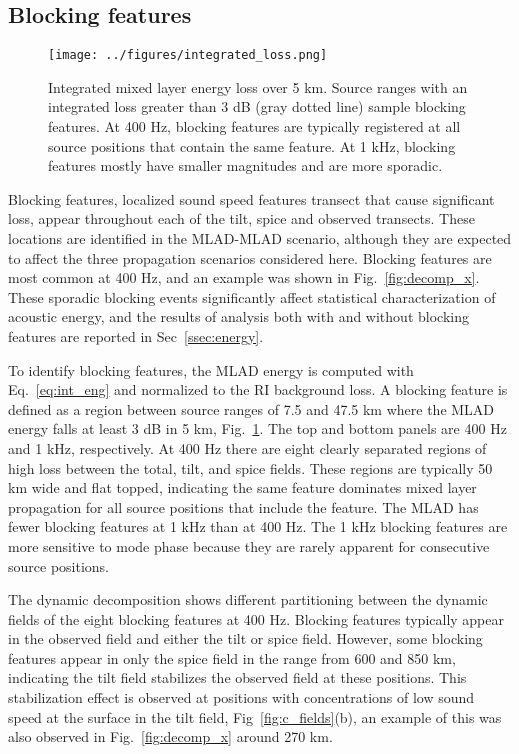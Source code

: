 \documentclass[preprint,NumberedRefs]{JASA}
\begin{document}
\subsection{Blocking features}\label{ssec:blocking}
\begin{figure}
\texttt{[image: ../figures/integrated\_loss.png]}
    \caption{Integrated mixed layer energy loss over 5 km. Source ranges with an integrated loss greater than 3 dB (gray dotted line) sample blocking features. At 400 Hz, blocking features are typically registered at all source positions that contain the same feature. At 1 kHz, blocking features mostly have smaller magnitudes and are more sporadic.}
    \label{fig:blocking}
\end{figure}

Blocking features, localized sound speed features transect that cause significant loss, appear throughout each of the tilt, spice and observed transects. These locations are identified in the MLAD-MLAD scenario, although they are expected to affect the three propagation scenarios considered here. Blocking features are most common at 400 Hz, and an example was shown in Fig.~\ref{fig:decomp_x}. These sporadic blocking events significantly affect statistical characterization of acoustic energy, and the results of analysis both with and without blocking features are reported in Sec~\ref{ssec:energy}.

To identify blocking features, the MLAD energy is computed with Eq.~\eqref{eq:int_eng} and normalized to the RI background loss. A blocking feature is defined as a region between source ranges of 7.5 and 47.5 km where the MLAD energy falls at least 3 dB in 5 km, Fig.~\ref{fig:blocking}. The top and bottom panels are 400 Hz and 1 kHz, respectively. At 400 Hz there are eight clearly separated regions of high loss between the total, tilt, and spice fields. These regions are typically 50 km wide and flat topped, indicating the same feature dominates mixed layer propagation for all source positions that include the feature. The MLAD has fewer blocking features at 1 kHz than at 400 Hz. The 1 kHz blocking features are more sensitive to mode phase because they are rarely apparent for consecutive source positions.

The dynamic decomposition shows different partitioning between the dynamic fields of the eight blocking features at 400 Hz. Blocking features typically appear in the observed field and either the tilt or spice field. However, some blocking features appear in only the spice field in the range from 600 and 850 km, indicating the tilt field stabilizes the observed field at these positions. This stabilization effect is observed at positions with concentrations of low sound speed at the surface in the tilt field, Fig~\ref{fig:c_fields}(b), an example of this was also observed in Fig.~\ref{fig:decomp_x} around 270 km.
\end{document}
